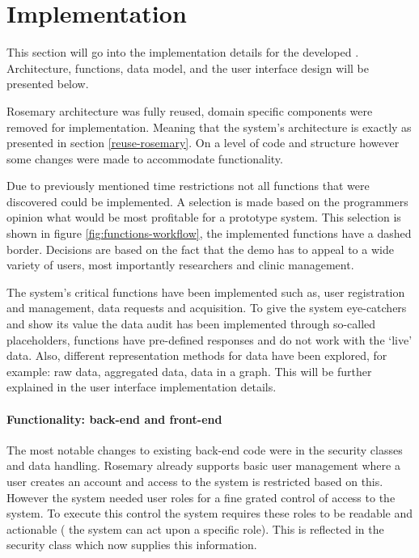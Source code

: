 \section{Implementation \ivfsystem{}}

This section will go into the implementation details for the developed \ivfsystem{}.
Architecture, functions, data model, and the user interface design will be presented below.

Rosemary architecture was fully reused, domain specific components were removed for \ivfsystem{} implementation.
Meaning that the system's architecture is exactly as presented in section \ref{reuse-rosemary}.
On a level of code and structure however some changes were made to accommodate \ivfsystem{} functionality.

Due to previously mentioned time restrictions not all functions that were discovered could be implemented.
A selection is made based on the programmers opinion what would be most profitable for a prototype system.
This selection is shown in figure \ref{fig:functions-workflow}, the implemented functions have a dashed border.
Decisions are based on the fact that the demo has to appeal to a wide variety of users, most importantly researchers and clinic management.

The system's critical functions have been implemented such as, user registration and management, data requests and acquisition.
To give the system eye-catchers and show its value the data audit has been implemented through so-called placeholders, \ie{} functions have pre-defined responses and do not work with the `live' data.
Also, different representation methods for data have been explored, for example: raw data, aggregated data, data in a graph.
This will be further explained in the user interface implementation details.

\paragraph{Functionality: back-end and front-end}
The most notable changes to existing back-end code were in the security classes and data handling.
Rosemary already supports basic user management where a user creates an account and access to the system is restricted based on this.
However the system needed user roles for a fine grated control of access to the system.
To execute this control the system requires these roles to be readable and actionable (\ie{} the system can act upon a specific role).
This is reflected in the security class which now supplies this information.

